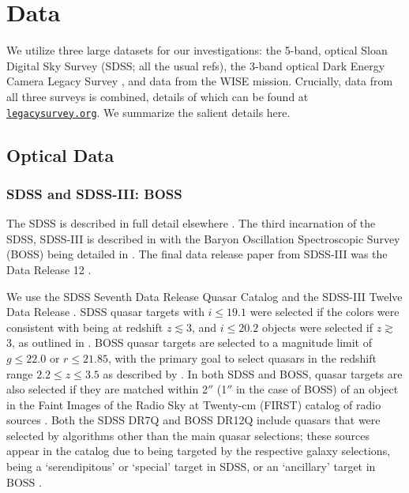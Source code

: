 \documentclass[apj]{emulateapj}
\begin{document}
\section{Data}
We utilize three large datasets for our investigations: the 5-band,
optical Sloan Digital Sky Survey (SDSS; all the usual refs), the
3-band optical Dark Energy Camera Legacy Survey
\citep[DECaLS]{Lang16}, and data from the WISE mission. Crucially,
data from all three surveys is combined, details of which can be found
at \href{legacysurvey.org}{\tt legacysurvey.org}. We summarize the
salient details here.

\subsection{Optical Data}
    \subsubsection{SDSS and SDSS-III: BOSS}
    The SDSS is described in full detail elsewhere \citep{Fukugita96,
      Gunn98, York00, Hogg01, Lupton01, Stoughton02, Smith02, Pier03,
      Ivezic04, Gunn06, Tucker06, Padmanabhan08a}. The third incarnation of
    the SDSS, SDSS-III is described in \citet{Eisenstein11} with the
    Baryon Oscillation Spectroscopic Survey (BOSS) being detailed in
    \citet{Dawson13}. The final data release paper from SDSS-III was the
    Data Release 12 \citep{DR12}.
    
    We use the SDSS Seventh Data Release Quasar Catalog
    \citep[DR7Q;][]{Schneider10, Shen11} and the SDSS-III Twelve Data
    Release \citep[DR12Q;][]{Paris2017}. SDSS quasar targets with
    $i\leq19.1$ were selected if the colors were consistent with being at
    redshift $z\lesssim3$, and $i\leq20.2$ objects were selected if
    $z\gtrsim$3, as outlined in \citet{Richards02}. BOSS quasar targets
    are selected to a magnitude limit of $g \leq 22.0$ or $r\leq 21.85$,
    with the primary goal to select quasars in the redshift range $2.2\leq
    z \leq 3.5$ as described by \citet[][and references
    therein]{Ross12}. In both SDSS and BOSS, quasar targets are also
    selected if they are matched within 2$''$ (1$''$ in the case of BOSS)
    of an object in the Faint Images of the Radio Sky at Twenty-cm (FIRST)
    catalog of radio sources \citep{Becker95}. Both the SDSS DR7Q and
    BOSS DR12Q include quasars that were selected by algorithms other than
    the main quasar selections; these sources appear in the catalog due
    to being targeted by the respective galaxy selections, being a
    `serendipitous' \citep{Stoughton02} or `special' \citep{DR4} target in
    SDSS, or an `ancillary' target in BOSS \citep[][]{Dawson13, DR12, DR13}.
    
\end{document}

